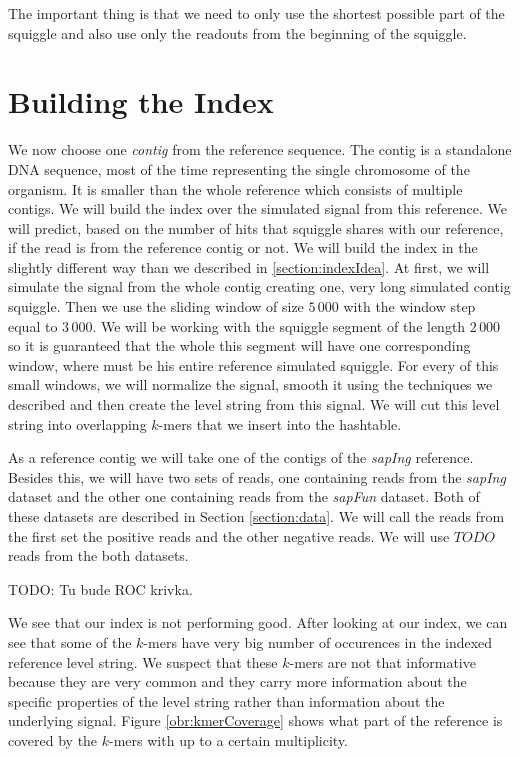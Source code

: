 The important thing is that we need to only use the shortest possible part of the squiggle
and also use only the readouts from the beginning of the squiggle.

\section{Building the Index}

We now choose one \textit{contig} from the reference sequence. The contig is a
standalone DNA sequence, most of the time representing the single chromosome
of the organism. It is smaller than the whole reference which consists of multiple contigs.
We will build the index over the simulated signal from this reference. We will predict,
based on the number of hits that squiggle shares with our reference, if the read is from the reference contig
or not. We will build the index in the slightly different way than we described in \ref{section:indexIdea}.
At first, we will simulate the signal from the whole contig creating one, very long simulated contig squiggle.
Then we use the sliding window of size $5\,000$ with the window step equal to $3\,000$.
We will be working with the squiggle segment of the length $2\,000$ so it is guaranteed that the
whole this segment will have one corresponding window, where must be his entire
reference simulated squiggle. For every of this small windows, we will normalize the signal, smooth
it using the techniques we described and then create the level string from this signal.
We will cut this level string into overlapping $k$-mers that we insert into the
hashtable.

As a reference contig we will take one of the contigs of the \textit{sapIng} reference.
Besides this, we will have two sets of reads, one containing reads from the \textit{sapIng}
dataset and the other one containing reads from the \textit{sapFun} dataset. Both of these datasets
are described in Section \ref{section:data}. We will call the reads from the first set the
positive reads and the other negative reads. We will use $TODO$ reads from the both datasets.

TODO: Tu bude ROC krivka.

We see that our index is not performing good. After looking at our index, we can
see that some of the $k$-mers have very big number of occurences in the indexed
reference level string. We suspect that these $k$-mers are not that informative
because they are very common and they carry more information about the specific
properties of the level string rather than information about the underlying signal.
Figure \ref{obr:kmerCoverage} shows what part of the reference is covered by the $k$-mers with
up to a certain multiplicity.

